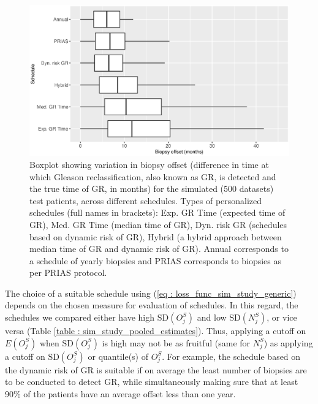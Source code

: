 \begin{figure}[!htb]
\centerline{\includegraphics[width=\columnwidth]{images/sim_study/offsetBoxPlot_all.eps}}
\caption{Boxplot showing variation in biopsy offset (difference in time at which Gleason reclassification, also known as GR, is detected and the true time of GR, in months) for the simulated (500 datasets) test patients, across different schedules. Types of personalized schedules (full names in brackets): Exp. GR Time (expected time of GR), Med. GR Time (median time of GR), Dyn. risk GR (schedules based on dynamic risk of GR), Hybrid (a hybrid approach between median time of GR and dynamic risk of GR). Annual corresponds to a schedule of yearly biopsies and PRIAS corresponds to biopsies as per PRIAS protocol.}
\label{fig : offsetBoxPlot_all}
\end{figure}

The choice of a suitable schedule using (\ref{eq : loss_func_sim_study_generic}) depends on the chosen measure for evaluation of schedules. In this regard, the schedules we compared either have high $\mbox{SD}(O^S_j)$ and low $\mbox{SD}(N^S_j)$, or vice versa (Table \ref{table : sim_study_pooled_estimates}). Thus, applying a cutoff on $E(O^S_j)$ when $\mbox{SD}(O^S_j)$ is high may not be as fruitful (same for $N^S_j$) as applying a cutoff on $\mbox{SD}(O^S_j)$ or quantile(s) of $O^S_j$. For example, the schedule based on the dynamic risk of GR is suitable if on average the least number of biopsies are to be conducted to detect GR, while simultaneously making sure that at least 90\% of the patients have an average offset less than one year.

